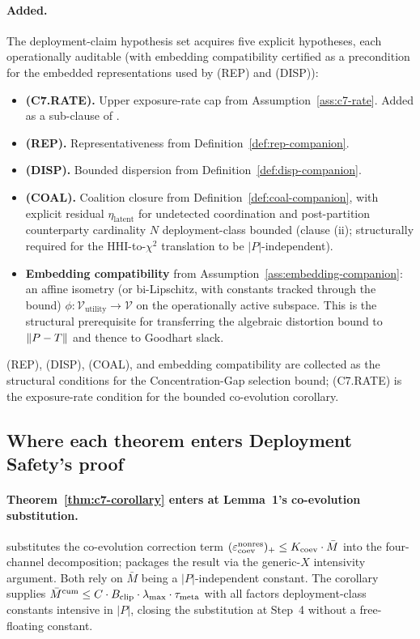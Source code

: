 \paragraph{Added.} The deployment-claim hypothesis set acquires
five explicit hypotheses, each operationally auditable (with
embedding compatibility certified as a precondition for the
embedded representations used by (REP) and (DISP)):
\begin{itemize}
\item \textbf{(C7.RATE).} Upper exposure-rate cap from
  Assumption~\ref{ass:c7-rate}. Added as a sub-clause of
  \citep[Condition~(C7)]{lasser2026paper10}.
\item \textbf{(REP).} Representativeness from
  Definition~\ref{def:rep-companion}.
\item \textbf{(DISP).} Bounded dispersion from
  Definition~\ref{def:disp-companion}.
\item \textbf{(COAL).} Coalition closure from
  Definition~\ref{def:coal-companion}, with explicit residual
  $\eta_{\mathrm{latent}}$ for undetected coordination and
  post-partition counterparty cardinality $N$ deployment-class
  bounded (clause (ii); structurally required for the
  HHI-to-$\chi^2$ translation to be $|P|$-independent).
\item \textbf{Embedding compatibility} from
  Assumption~\ref{ass:embedding-companion}: an affine isometry
  (or bi-Lipschitz, with constants tracked through the bound)
  $\phi: \mathcal{V}_\mathrm{utility} \to \mathcal{V}$ on the
  operationally active subspace. This is the structural
  prerequisite for transferring the algebraic distortion bound to
  $\|P - T\|$ and thence to Goodhart slack.
\end{itemize}

(REP), (DISP), (COAL), and embedding compatibility are collected
as the structural conditions for the Concentration-Gap selection
bound; (C7.RATE) is the exposure-rate condition for the bounded
co-evolution corollary.

\subsection{Where each theorem enters Deployment Safety's proof}

\paragraph{Theorem~\ref{thm:c7-corollary} enters at Lemma~1's co-evolution substitution.}
\citep[Lemma~1, Step~4]{lasser2026paper10} substitutes the
co-evolution correction term $(\varepsilon_{\mathrm{coev}}^{\mathrm{nonres}})_+ \leq
K_{\mathrm{coev}} \cdot \bar{M}$ into the four-channel
decomposition; \citep[Lemma~1, Step~6]{lasser2026paper10}
packages the result via the generic-$X$ intensivity argument.
Both rely on $\bar{M}$ being a $|P|$-independent constant. The
corollary supplies $\bar{M}^{\mathrm{cum}} \leq C \cdot B_{\mathrm{clip}}
\cdot \lambda_{\max} \cdot \tau_{\mathrm{meta}}$ with all factors deployment-class
constants intensive in $|P|$, closing the substitution at Step~4
without a free-floating constant.

